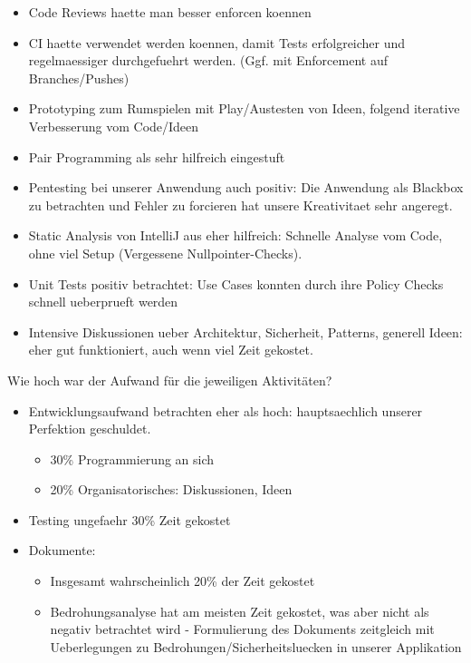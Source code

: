 \documentclass[12pt,DIV14,BCOR10mm,a4paper,parskip=half-,headsepline,headinclude,english,ngerman,bibliography=totocnumbered]{scrreprt}
\begin{document}
\begin{itemize}
  \item Code Reviews haette man besser enforcen koennen
  \item CI haette verwendet werden koennen, damit Tests erfolgreicher und regelmaessiger durchgefuehrt werden. (Ggf. mit Enforcement auf Branches/Pushes)
  \item Prototyping zum Rumspielen mit Play/Austesten von Ideen, folgend iterative Verbesserung vom Code/Ideen
  \item Pair Programming als sehr hilfreich eingestuft
  \item Pentesting bei unserer Anwendung auch positiv: Die Anwendung als Blackbox zu betrachten und Fehler zu forcieren hat unsere Kreativitaet sehr angeregt.
  \item Static Analysis von IntelliJ aus eher hilfreich: Schnelle Analyse vom Code, ohne viel Setup (Vergessene Nullpointer-Checks).
  \item Unit Tests positiv betrachtet: Use Cases konnten durch ihre Policy Checks schnell ueberprueft werden
  \item Intensive Diskussionen ueber Architektur, Sicherheit, Patterns, generell Ideen: eher gut funktioniert, auch wenn viel Zeit gekostet.
\end{itemize}

Wie hoch war der Aufwand für die jeweiligen Aktivitäten?

\begin{itemize}
  \item Entwicklungsaufwand betrachten eher als hoch: hauptsaechlich unserer Perfektion geschuldet.
  \begin{itemize}
    \item 30\% Programmierung an sich
    \item 20\% Organisatorisches: Diskussionen, Ideen
  \end{itemize}
  \item Testing ungefaehr 30\% Zeit gekostet
  \item Dokumente:
  \begin{itemize}
    \item Insgesamt wahrscheinlich 20\% der Zeit gekostet
    \item Bedrohungsanalyse hat am meisten Zeit gekostet, was aber nicht als negativ betrachtet wird - Formulierung des Dokuments zeitgleich mit Ueberlegungen zu Bedrohungen/Sicherheitsluecken in unserer Applikation
  \end{itemize}
\end{itemize}
\end{document}
